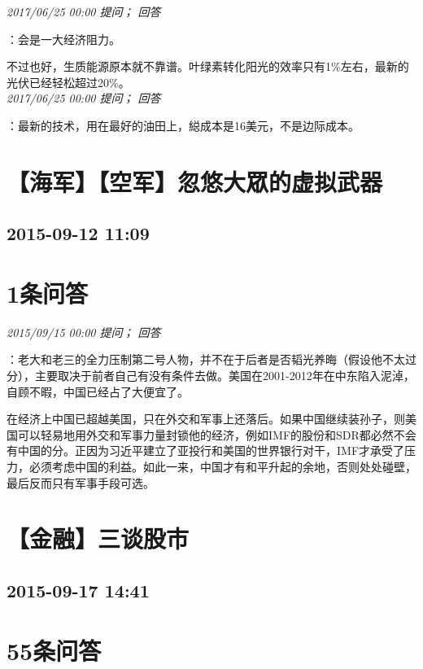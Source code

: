 \documentclass[twocolumn]{ctexart}
\begin{document}
\textit{\hfill\noindent\small 2017/06/25 00:00 提问； 回答}

：会是一大经济阻力。

不过也好，生质能源原本就不靠谱。叶绿素转化阳光的效率只有1\%左右，最新的光伏已经轻松超过20\%。\\

\textit{\hfill\noindent\small 2017/06/25 00:00 提问； 回答}

：最新的技术，用在最好的油田上，縂成本是16美元，不是边际成本。\\


\section{【海军】【空军】忽悠大眾的虚拟武器}
\subsection{2015-09-12 11:09}


\section{1条问答}

\textit{\hfill\noindent\small 2015/09/15 00:00 提问； 回答}

：老大和老三的全力压制第二号人物，并不在于后者是否韬光养晦（假设他不太过分），主要取决于前者自己有没有条件去做。美国在2001-2012年在中东陷入泥淖，自顾不暇，中国已经占了大便宜了。

在经济上中国已超越美国，只在外交和军事上还落后。如果中国继续装孙子，则美国可以轻易地用外交和军事力量封锁他的经济，例如IMF的股份和SDR都必然不会有中国的分。正因为习近平建立了亚投行和美国的世界银行对干，IMF才承受了压力，必须考虑中国的利益。如此一来，中国才有和平升起的余地，否则处处碰壁，最后反而只有军事手段可选。\\


\section{【金融】三谈股市}
\subsection{2015-09-17 14:41}


\section{55条问答}
\end{document}
